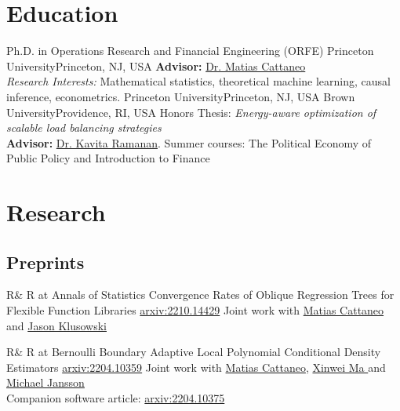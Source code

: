 \documentclass[10pt,a4paper,roman]{moderncv}        %
\begin{document}
\makecvtitle

\vspace{-0.4cm}
\section{Education}
{Ph.D. in Operations Research and Financial Engineering (ORFE)}
{Princeton University}{Princeton, NJ, USA}{}
{\textbf{Advisor: }\color{blue}\href{https://cattaneo.princeton.edu}{Dr. Matias Cattaneo}\color{black}\\
\textit{Research Interests:} Mathematical statistics, theoretical machine learning, causal inference, econometrics.}
{Princeton University}{Princeton, NJ, USA}{}{}
{Brown University}{Providence, RI, USA}{}{ Honors Thesis: \textit{Energy-aware optimization of scalable load balancing
    strategies}
  \\
  \textbf{Advisor: }
  \color{blue}\href{https://www.brown.edu/academics/applied-mathematics/faculty/kavita-ramanan/home}
  {Dr. Kavita Ramanan}\color{black}.}  %
{Summer courses: The Political Economy of Public Policy and Introduction to Finance}

\vspace{-0.3cm}
\section{Research}
\subsection{Preprints}
\cventry{}
{R\& R at Annals of Statistics}
{Convergence Rates of Oblique Regression Trees for Flexible Function Libraries}
{\color{blue} \href{https://arxiv.org/abs/2210.14429}{arxiv:2210.14429} \color{black}}
{}
{Joint work with
  \color{blue}\href{https://cattaneo.princeton.edu}{Matias Cattaneo }\color{black} and
  \color{blue}\href{https://klusowski.princeton.edu}{Jason Klusowski}}

\cventry{}
{R\& R at Bernoulli}
{Boundary Adaptive Local Polynomial Conditional Density Estimators}
{\color{blue}\href{https://arxiv.org/abs/2204.10359}{arxiv:2204.10359}\color{black}}{}
{Joint work with \color{blue}\href{https://cattaneo.princeton.edu}{Matias Cattaneo}\color{black},
  \color{blue}\href{https://sites.google.com/view/xinweima/home?authuser=0}{Xinwei
    Ma }\color{black}
  and
  \color{blue}\href{https://sites.google.com/berkeley.edu/michael-jansson/}{Michael
    Jansson}\color{black}
  \\
  Companion software article: \color{blue}\href{https://arxiv.org/abs/2204.10375}{arxiv:2204.10375}\color{black}}
\end{document}
